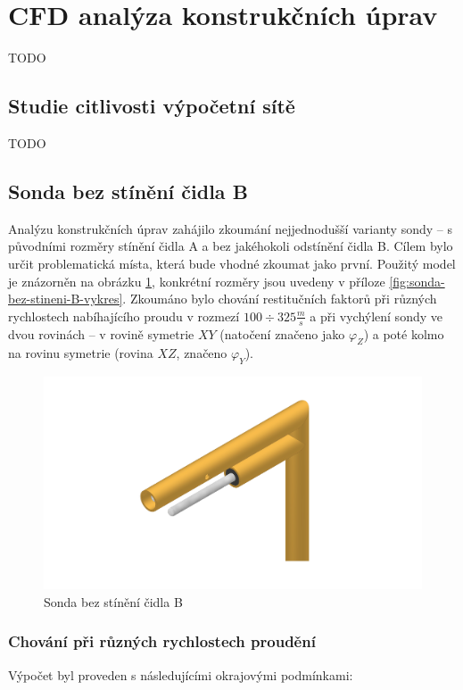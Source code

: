 \section{CFD analýza konstrukčních úprav} \label{sec:konstrukcni-upravy}
    TODO
    
    \subsection{Studie citlivosti výpočetní sítě}
        TODO
    \subsection{Sonda bez stínění čidla B}
        Analýzu konstrukčních úprav zahájilo zkoumání nejjednodušší varianty sondy – s původními rozměry stínění čidla A a bez jakéhokoli odstínění čidla B. Cílem bylo určit problematická místa, která bude vhodné zkoumat jako první. Použitý model je znázorněn na obrázku \ref{fig:sonda-bez-stineni-B}, konkrétní rozměry jsou uvedeny v příloze \ref{fig:sonda-bez-stineni-B-vykres}. Zkoumáno bylo chování restitučních faktorů při různých rychlostech nabíhajícího proudu v rozmezí $100 \div 325 \unit{\frac{m}{s}}$ a při vychýlení sondy ve dvou rovinách – v rovině symetrie $XY$ (natočení značeno jako $\varphi _Z$) a poté kolmo na rovinu symetrie (rovina $XZ$, značeno $\varphi _Y$).
        
        \begin{figure}[ht!]
            \centering
            \includegraphics[width=\textwidth]{400_SIMULACE_KONSTRUKCNICH_UPRAV/Vykresy_rendery/Sonda_bez_stineni_B.png}
            \caption{Sonda bez stínění čidla B}
            \label{fig:sonda-bez-stineni-B}
        \end{figure}
        \subsubsection{Chování při různých rychlostech proudění}
            Výpočet byl proveden s následujícími okrajovými podmínkami:
            
